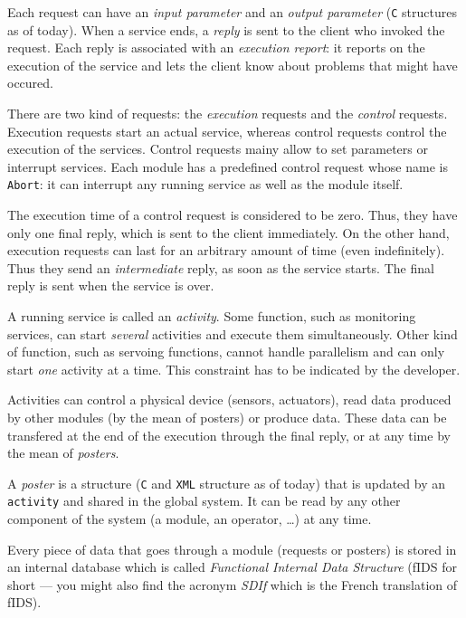 Each request can  have an \emph{input parameter} and an  
\emph{output parameter} (\texttt{C} structures as  of today). When a service ends,
a   \emph{reply} is sent to   the   client who invoked  the 
request. Each reply  is  associated with an  \emph{execution  report}:  it
reports on the execution of  the service and  lets  the client  know about
problems that might have occured.

There are two kind of requests: the \emph{execution} requests and the 
\emph{control} requests. Execution requests  start  an actual service,  whereas
control requests control the  execution of the services. Control requests
mainy allow to set parameters or  interrupt services. Each module has  a
predefined control request whose name  is  \texttt{Abort}: it can  interrupt
any running service as well as the module itself.

The execution time of  a control request  is considered to be zero. Thus,
they have only one final reply, which is  sent to the client immediately.
On the other hand, execution requests can last for an arbitrary amount of
time (even indefinitely). Thus they send an \emph{intermediate} reply,  as
soon as the service 
starts.  The final reply is sent when the service is over.

A running  service is called an   \emph{activity}. Some function,  such as
monitoring services,  can start \emph{several}  activities and  execute them
simultaneously. Other  kind   of function,  such as   servoing functions,
cannot handle  parallelism  and can only  start  \emph{one} activity at  a
time. This constraint has to be indicated by the developer.

Activities can control a physical device (sensors, actuators), read  data
produced by  other modules (by  the mean of  posters) or produce
data. These data can  be transfered at the end  of the  execution through
the final reply, or at any time by the mean of \emph{posters}.

A \emph{poster} is a structure (\texttt{C} and \texttt{XML} structure as  of  
today) that is
updated by an \texttt{activity} and shared in the global system. It can be read by
any other component of the system (a module, an operator, \ldots) at any time.

Every piece  of data that goes through  a module (requests or posters) is
stored  in an internal database  which is called \emph{Functional Internal
Data Structure} (fIDS  for short --- you might  also find the acronym
\emph{SDIf} which is the French translation of fIDS).

